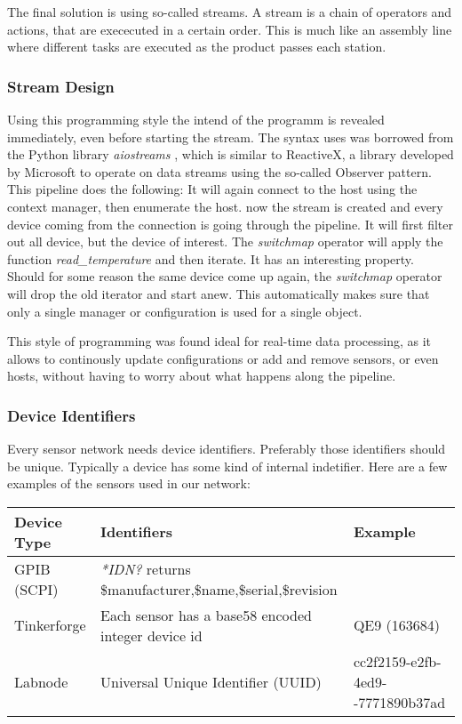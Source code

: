 The final solution is using so-called streams. A stream is a chain of operators and actions, that are exececuted in a certain order. This is much like an assembly line where different tasks are executed as the product passes each station.

\subsubsection{Stream Design}


Using this programming style the intend of the programm is revealed immediately, even before starting the stream. The syntax uses was borrowed from the Python library \textit{aiostreams} \cite{aiostreams}, which is similar to ReactiveX, a library developed by Microsoft to operate on data streams using the so-called Observer pattern. This pipeline does the following: It will again connect to the host using the context manager, then enumerate the host. now the stream is created and every device coming from the connection is going through the pipeline. It will first filter out all device, but the device of interest. The \textit{switchmap} operator will apply the function \textit{read\_temperature} and then iterate. It has an interesting property. Should for some reason the same device come up again, the \textit{switchmap} operator will drop the old iterator and start anew. This automatically makes sure that only a single manager or configuration is used for a single object.

This style of programming was found ideal for real-time data processing, as it allows to continously update configurations or add and remove sensors, or even hosts, without having to worry about what happens along the pipeline.

\subsubsection{Device Identifiers}
Every sensor network needs device identifiers. Preferably those identifiers should be unique. Typically a device has some kind of internal indetifier. Here are a few examples of the sensors used in our network:

\begin{table}[ht]
\centering
\begin{tabularx}{0.95\textwidth}{|l|p{6.5cm}|X|}
    \hline
    Device Type& Identifiers& Example\\
    \hline
    GPIB (SCPI)& \textit{*IDN?} returns \newline \$manufacturer,\$name,\$serial,\$revision& \\
    \hline
    Tinkerforge& Each sensor has a base58 encoded integer device id& QE9 (163684)\\
    \hline
    Labnode& Universal Unique Identifier (UUID) & cc2f2159-e2fb-4ed9-\newline8021-7771890b37ad\\
    \hline
\end{tabularx}
\end{table}


